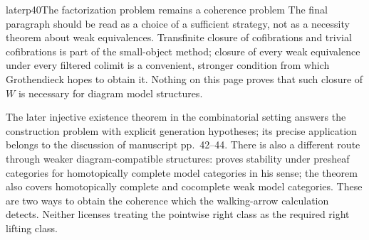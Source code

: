 \begin{dcomment}{later}{p40}{The factorization problem remains a coherence problem}
The final paragraph should be read as a choice of a sufficient strategy, not as a necessity theorem about weak equivalences. Transfinite closure of cofibrations and trivial cofibrations is part of the small-object method; closure of every weak equivalence under every filtered colimit is a convenient, stronger condition from which Grothendieck hopes to obtain it. Nothing on this page proves that such closure of $W$ is necessary for diagram model structures.

The later injective existence theorem in the combinatorial setting answers the construction problem with explicit generation hypotheses; its precise application belongs to the discussion of manuscript pp.~42--44. There is also a different route through weaker diagram-compatible structures: \citet[Theorem~6.22]{Cisinski2010} proves stability under presheaf categories for homotopically complete model categories in his sense; the theorem also covers homotopically complete and cocomplete weak model categories. These are two ways to obtain the coherence which the walking-arrow calculation detects. Neither licenses treating the pointwise right class as the required right lifting class.
\end{dcomment}

